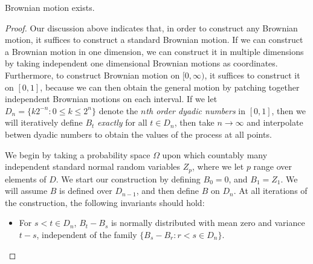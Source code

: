 \begin{theorem}[Wiener]
    Brownian motion exists.
\end{theorem}
\begin{proof}
    Our discussion above indicates that, in order to construct any Brownian motion, it suffices to construct a standard Brownian motion. If we can construct a Brownian motion in one dimension, we can construct it in multiple dimensions by taking independent one dimensional Brownian motions as coordinates. Furthermore, to construct Brownian motion on $[0,\infty)$, it suffices to construct it on $[0,1]$, because we can then obtain the general motion by patching together independent Brownian motions on each interval. If we let $D_n = \{ k2^{-n}: 0 \leq k \leq 2^n \}$ denote the {\it $n$th order dyadic numbers} in $[0,1]$, then we will iteratively define $B_t$ {\it exactly} for all $t \in D_n$, then take $n \to \infty$ and interpolate betwen dyadic numbers to obtain the values of the process at all points.

    We begin by taking a probability space $\Omega$ upon which countably many independent standard normal random variables $Z_p$, where we let $p$ range over elements of $D$. We start our construction by defining $B_0 = 0$, and $B_1 = Z_1$. We will assume $B$ is defined over $D_{n-1}$, and then define $B$ on $D_n$. At all iterations of the construction, the following invariants should hold:
    \begin{itemize}
        \item For $s < t \in D_n$, $B_t - B_s$ is normally distributed with mean zero and variance $t - s$, independent of the family $\{ B_s - B_r: r < s \in D_n \}$.


\end{itemize}
\end{proof}
